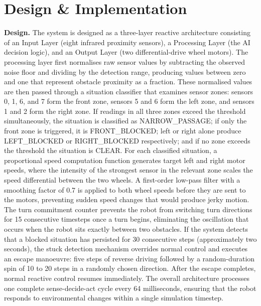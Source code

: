 \documentclass[12pt, a4paper]{article}
\begin{document}
\section{Design \& Implementation}

\textbf{Design.} The system is designed as a three-layer reactive architecture consisting of an Input Layer (eight infrared proximity sensors), a Processing Layer (the AI decision logic), and an Output Layer (two differential-drive wheel motors). The processing layer first normalises raw sensor values by subtracting the observed noise floor and dividing by the detection range, producing values between zero and one that represent obstacle proximity as a fraction. These normalised values are then passed through a situation classifier that examines sensor zones: sensors 0, 1, 6, and 7 form the front zone, sensors 5 and 6 form the left zone, and sensors 1 and 2 form the right zone. If readings in all three zones exceed the threshold simultaneously, the situation is classified as NARROW\_PASSAGE; if only the front zone is triggered, it is FRONT\_BLOCKED; left or right alone produce LEFT\_BLOCKED or RIGHT\_BLOCKED respectively; and if no zone exceeds the threshold the situation is CLEAR. For each classified situation, a proportional speed computation function generates target left and right motor speeds, where the intensity of the strongest sensor in the relevant zone scales the speed differential between the two wheels. A first-order low-pass filter with a smoothing factor of 0.7 is applied to both wheel speeds before they are sent to the motors, preventing sudden speed changes that would produce jerky motion. The turn commitment counter prevents the robot from switching turn directions for 15 consecutive timesteps once a turn begins, eliminating the oscillation that occurs when the robot sits exactly between two obstacles. If the system detects that a blocked situation has persisted for 30 consecutive steps (approximately two seconds), the stuck detection mechanism overrides normal control and executes an escape manoeuvre: five steps of reverse driving followed by a random-duration spin of 10 to 20 steps in a randomly chosen direction. After the escape completes, normal reactive control resumes immediately. The overall architecture processes one complete sense-decide-act cycle every 64 milliseconds, ensuring that the robot responds to environmental changes within a single simulation timestep.
\end{document}
